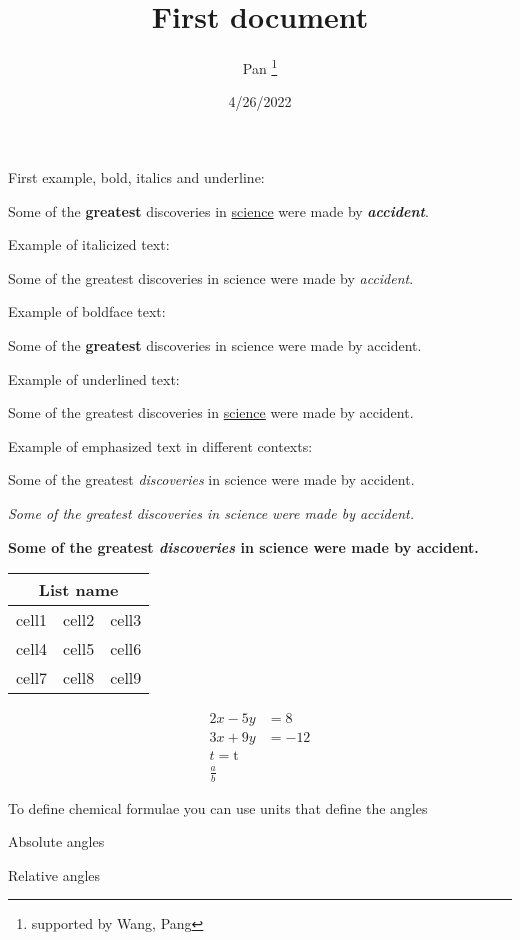 \documentclass[12pt, letterpaper]{article}
\title{First document}
\author{Pan \thanks{supported by Wang, Pang}}
\date{4/26/2022}
\begin{document}
	
	\begin{titlepage}
		\maketitle
	\end{titlepage}

First example, bold, italics and underline:

Some of the \textbf{greatest} discoveries in \underline{science} were made by \textbf{\emph{accident}}.

\vspace{1.5cm}

Example of italicized text: 

Some of the greatest discoveries in science were made by \emph{accident}.

\vspace{1.5cm}

Example of boldface text:

Some of the \textbf{greatest} discoveries in science were made by accident.

\vspace{1.5cm}

Example of underlined text:

Some of the greatest discoveries in \underline{science} were made by accident.

\vspace{1.5cm}

Example of emphasized text in different contexts:

Some of the greatest \emph{discoveries} in science were made by accident.

\textit{Some of the greatest \emph{discoveries} in science were made by accident.}

\textbf{Some of the greatest \emph{discoveries} in science were made by accident.}

\newpage

\begin{center}
	\begin{tabular}{ |m{5em}| m{2cm} ||m{1cm}| }
		\multicolumn{3}{|c|}{List name} \\
		\hline
		cell1 & cell2 & cell3 \\ 
		\hline
		cell4 & cell5 & cell6 \\  
		cell7 & cell8 & cell9    
	\end{tabular}
\end{center}

\newpage
\begin{align} 
	2x - 5y &=  8 \\ 
	3x + 9y &=  -12 \\
	t = \text{t} \\
	\frac{a}{b}
\end{align}

\newpage
To define chemical formulae you can use units that define the angles


Absolute angles


Relative angles

\end{document}
